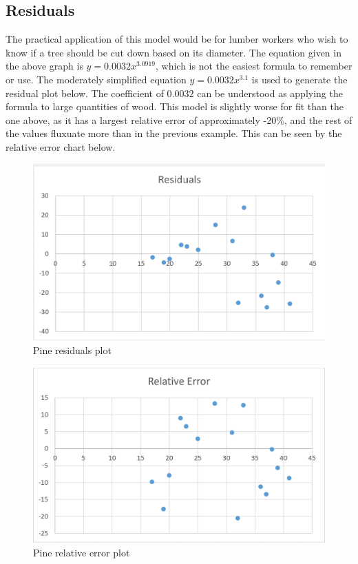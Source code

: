 \documentclass[12pt]{extarticle}
\begin{document}
\subsection{Residuals}
The practical application of this model would be for lumber workers who wish to know if a tree should be cut down based on its diameter. The equation given in the above graph is $y = 0.0032x^{3.0919}$, which is not the easiest formula to remember or use. The moderately simplified equation $y = 0.0032x^{3.1}$ is used to generate the residual plot below. The coefficient of $0.0032$ can be understood as applying the formula to large quantities of wood. This model is slightly worse for fit than the one above, as it has a largest relative error of approximately -20\%, and the rest of the values fluxuate more than in the previous example. This can be seen by the relative error chart below. 
\newpage
\begin{figure}[ht!]
  \includegraphics[width=\linewidth]{PineResiduals.PNG}
  \caption{Pine residuals plot}
\end{figure}
\begin{figure}[ht!]
  \includegraphics[width=\linewidth]{PinesRelativeError.PNG}
  \caption{Pine relative error plot}
\end{figure}
\newpage
\end{document}
